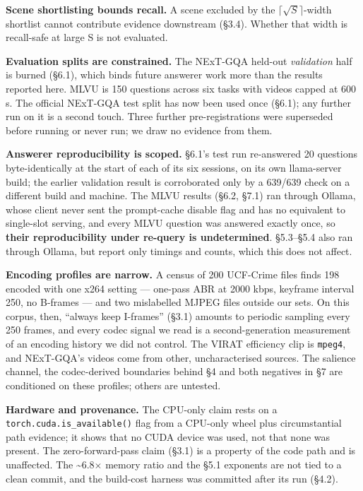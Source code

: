 \documentclass[sigconf,review,anonymous]{acmart}
\begin{document}
\textbf{Scene shortlisting bounds recall.} A scene excluded by the \(\lceil\sqrt{S}\rceil\)-width shortlist cannot
contribute evidence downstream (§3.4). Whether that width is recall-safe at large S is not
evaluated.

\textbf{Evaluation splits are constrained.} The NExT-GQA held-out \emph{validation} half is burned
(§6.1), which binds future answerer work more than the results reported here. MLVU is 150
questions across six tasks with videos capped at 600 s. The official NExT-GQA test split has now
been used once (§6.1); any further run on it is a second touch. Three further pre-registrations were
superseded before running or never run; we draw no evidence from them.

\textbf{Answerer reproducibility is scoped.} §6.1's test run re-answered 20 questions
byte-identically at the start of each of its six sessions, on its own llama-server build; the
earlier validation result is corroborated only by a 639/639 check on a different build and machine.
The MLVU results (§6.2, §7.1) ran through Ollama, whose client never sent the prompt-cache
disable flag and has no equivalent to single-slot serving, and every MLVU question was
answered exactly once, so \textbf{their reproducibility under re-query is undetermined}. §5.3--§5.4
also ran through Ollama, but report only timings and counts, which this does not affect.

\textbf{Encoding profiles are narrow.} A census of 200 UCF-Crime files finds 198 encoded with one
x264 setting --- one-pass ABR at 2000 kbps, keyframe interval 250, no B-frames --- and two
mislabelled MJPEG files outside our sets. On this corpus, then, ``always keep I-frames'' (§3.1)
amounts to periodic sampling every 250 frames, and every codec signal we read is a
second-generation measurement of an encoding history we did not control. The VIRAT efficiency
clip is \texttt{mpeg4}, and NExT-GQA's videos come from other, uncharacterised sources. The salience
channel, the codec-derived boundaries behind §4 and both negatives in §7 are conditioned on
these profiles; others are untested.

\textbf{Hardware and provenance.} The CPU-only claim rests on a \texttt{torch.cuda.is\_available()}
flag from a CPU-only wheel plus circumstantial path evidence; it shows that no CUDA device was
used, not that none was present. The zero-forward-pass claim (§3.1) is a property of the code
path and is unaffected. The \textasciitilde6.8\ensuremath{\times} memory ratio and the §5.1 exponents are not tied to a
clean commit, and the build-cost harness was committed after its run (§4.2).
\end{document}
